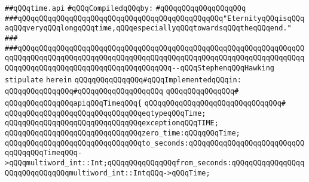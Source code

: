 \label{src/lib/std/src/time.api}
\verb|##qQQqtime.api|\newline
\newline
\verb|#qQQqCompiledqQQqby:|\newline
\verb|#qQQqqQQqqQQqqQQqqQQq|\newline
\newline
\newline
\newline
\verb|###qQQqqQQqqQQqqQQqqQQqqQQqqQQqqQQqqQQqqQQqqQQqqQQq"EternityqQQqisqQQqaqQQqveryqQQqlongqQQqtime,qQQqespeciallyqQQqtowardsqQQqtheqQQqend."|\newline
\verb|###|\newline
\verb|###qQQqqQQqqQQqqQQqqQQqqQQqqQQqqQQqqQQqqQQqqQQqqQQqqQQqqQQqqQQqqQQqqQQqqQQqqQQqqQQqqQQqqQQqqQQqqQQqqQQqqQQqqQQqqQQqqQQqqQQqqQQqqQQqqQQqqQQqqQQqqQQqqQQqqQQqqQQqqQQqqQQqqQQqqQQqqQQq--qQQqStephenqQQqHawking|\newline
\newline
\newline
\verb|stipulate|\newline
\verb|herein|\newline
\newline
\verb|qQQqqQQqqQQqqQQq#qQQqImplementedqQQqin:|\newline
\verb|qQQqqQQqqQQqqQQq#qQQqqQQqqQQqqQQqqQQq|\newline
\verb|qQQqqQQqqQQqqQQq#|\newline
\verb|qQQqqQQqqQQqqQQqapiqQQqTimeqQQq{|\newline
\verb|qQQqqQQqqQQqqQQqqQQqqQQqqQQqqQQq#|\newline
\verb|qQQqqQQqqQQqqQQqqQQqqQQqqQQqqQQqeqtypeqQQqTime;|\newline
\newline
\verb|qQQqqQQqqQQqqQQqqQQqqQQqqQQqqQQqexceptionqQQqTIME;|\newline
\newline
\verb|qQQqqQQqqQQqqQQqqQQqqQQqqQQqqQQqzero_time:qQQqqQQqTime;|\newline
\newline
\newline
\verb|qQQqqQQqqQQqqQQqqQQqqQQqqQQqqQQqto_seconds:qQQqqQQqqQQqqQQqqQQqqQQqqQQqqQQqqQQqTimeqQQq->qQQqmultiword_int::Int;qQQqqQQqqQQqqQQqfrom_seconds:qQQqqQQqqQQqqQQqqQQqqQQqqQQqqQQqmultiword_int::IntqQQq->qQQqTime;|\newline
